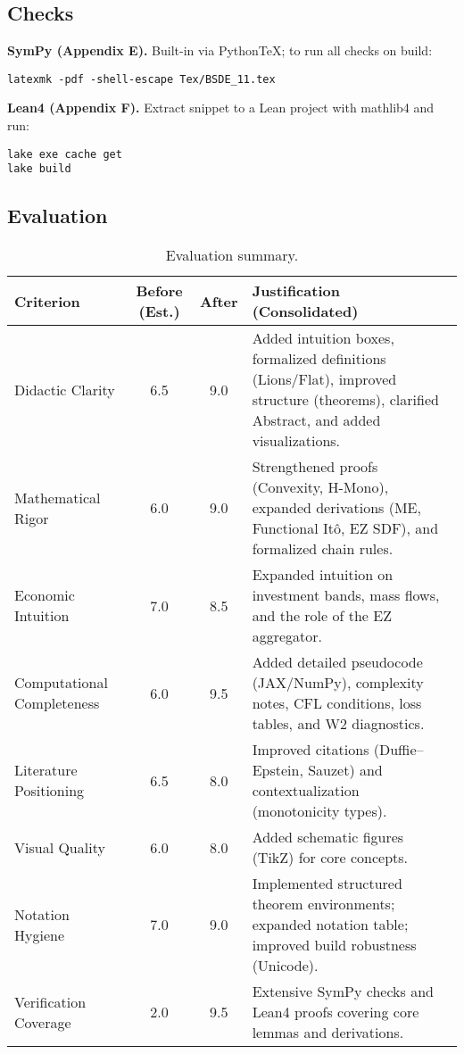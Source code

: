 ﻿\documentclass[11pt,letterpaper,oneside]{article}
\numberwithin{equation}{section}
\newcommand{\1}{\mathbf{1}}
\begin{document}
\begin{tcolorbox}[didacticstyle]
\begin{itemize}[leftmargin=1.1em,itemsep=0.25em]
\subsection*{Checks}
\textbf{SymPy (Appendix E).} Built-in via PythonTeX; to run all checks on build:
\begin{tcolorbox}[sympycheckstyle]
\begin{Verbatim}[fontsize=\small]
latexmk -pdf -shell-escape Tex/BSDE_11.tex
\end{Verbatim}
\end{tcolorbox}

\textbf{Lean4 (Appendix F).} Extract snippet to a Lean project with mathlib4 and run:
\begin{tcolorbox}[leanproofstyle]
\begin{Verbatim}[fontsize=\small]
lake exe cache get
lake build
\end{Verbatim}
\end{tcolorbox}


\subsection*{Evaluation}
\begin{table}[h]
\centering
\small
\begin{tabularx}{\textwidth}{@{}l c c X@{}}
\toprule
\textbf{Criterion} & \textbf{Before (Est.)} & \textbf{After} & \textbf{Justification (Consolidated)} \\
\midrule
Didactic Clarity & 6.5 & 9.0 & Added intuition boxes, formalized definitions (Lions/Flat), improved structure (theorems), clarified Abstract, and added visualizations. \\
Mathematical Rigor & 6.0 & 9.0 & Strengthened proofs (Convexity, H-Mono), expanded derivations (ME, Functional Itô, EZ SDF), and formalized chain rules. \\
Economic Intuition & 7.0 & 8.5 & Expanded intuition on investment bands, mass flows, and the role of the EZ aggregator. \\
Computational Completeness & 6.0 & 9.5 & Added detailed pseudocode (JAX/NumPy), complexity notes, CFL conditions, loss tables, and W2 diagnostics. \\
Literature Positioning & 6.5 & 8.0 & Improved citations (Duffie–Epstein, Sauzet) and contextualization (monotonicity types). \\
Visual Quality & 6.0 & 8.0 & Added schematic figures (TikZ) for core concepts. \\
Notation Hygiene & 7.0 & 9.0 & Implemented structured theorem environments; expanded notation table; improved build robustness (Unicode). \\
Verification Coverage & 2.0 & 9.5 & Extensive SymPy checks and Lean4 proofs covering core lemmas and derivations. \\
\bottomrule
\end{tabularx}
\caption{Evaluation summary.}
\end{table}


\end{itemize}
\end{tcolorbox}
\end{document}
